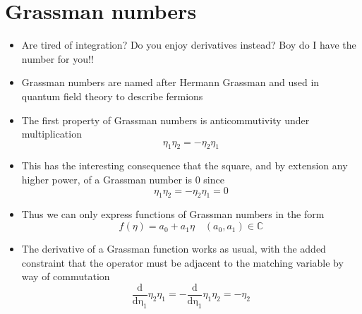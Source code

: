 \documentclass{article}
\begin{document}
\section{Grassman numbers}
\begin{itemize}
    \item Are tired of integration? Do you enjoy derivatives instead? Boy do I have the number for you!!
    \item Grassman numbers are named after Hermann Grassman and used in quantum field theory to describe fermions
    \item The first property of Grassman numbers is anticommutivity under multiplication
        \begin{equation}
            \eta_1\eta_2 = -\eta_2\eta_1
        \end{equation}
    \item This has the interesting consequence that the square, and by extension any higher power, of a Grassman number is 0 since
        \begin{equation}
            \eta_1\eta_2 = -\eta_2\eta_1 = 0
        \end{equation}
    \item Thus we can only express functions of Grassman numbers in the form
        \begin{equation}
            f(\eta) = a_0 + a_1\eta \quad (a_0, a_1) \in\mathbb{C}
        \end{equation}
    \item The derivative of a Grassman function works as usual, with the added constraint that the operator must be adjacent to the matching variable by way of commutation
        \begin{equation}
            \frac{\mathrm{d}}{\mathrm{d\eta_1}}\eta_2\eta_1 = -\frac{\mathrm{d}}{\mathrm{d\eta_1}}\eta_1\eta_2 = -\eta_2
        \end{equation}
\end{itemize}
\end{document}
